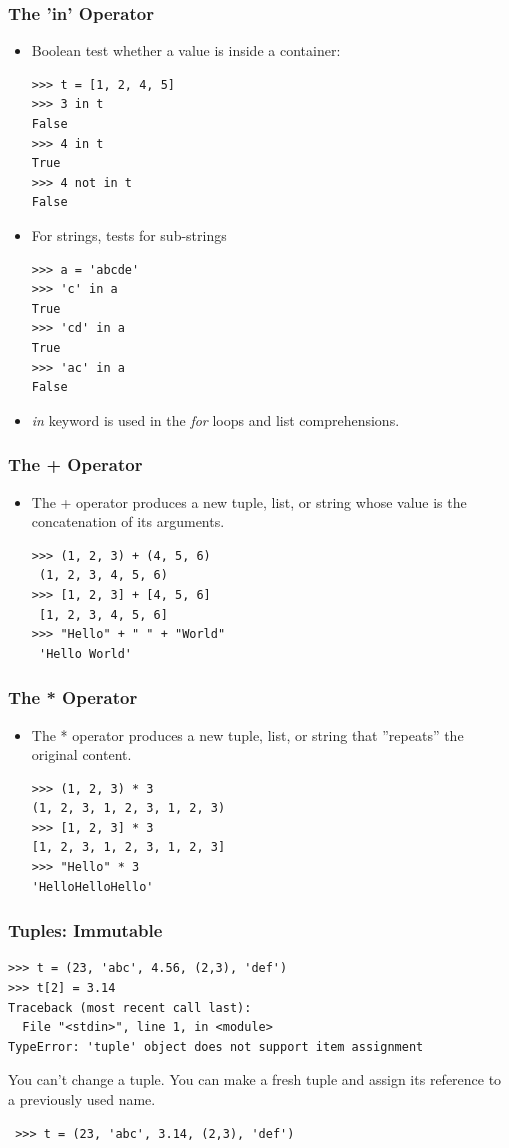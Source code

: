 \documentclass[12pt,handout]{beamer}
\begin{document}
\begin{frame}[fragile]
\frametitle{The 'in' Operator}
\begin{itemize}
\item Boolean test whether a value is inside a container:
\small{
\begin{verbatim}
>>> t = [1, 2, 4, 5]
>>> 3 in t
False
>>> 4 in t
True
>>> 4 not in t
False
\end{verbatim}
}
\item For strings, tests for sub-strings
\small{
\begin{verbatim}
>>> a = 'abcde'
>>> 'c' in a
True
>>> 'cd' in a
True
>>> 'ac' in a
False
\end{verbatim}
}
\item {\it in} keyword is used in the {\it for} loops
and list comprehensions.
\end{itemize}
\end{frame}


\begin{frame}[fragile]
\frametitle{The + Operator}
\begin{itemize}
\item The + operator produces a new tuple, list, or string whose
value is the concatenation of its arguments.
\small{
\begin{verbatim}
>>> (1, 2, 3) + (4, 5, 6)
 (1, 2, 3, 4, 5, 6)
>>> [1, 2, 3] + [4, 5, 6]
 [1, 2, 3, 4, 5, 6]
>>> "Hello" + " " + "World"
 'Hello World'
\end{verbatim}
}
\end{itemize}
\end{frame}


\begin{frame}[fragile]
\frametitle{The * Operator}
\begin{itemize}
\item The * operator produces a new tuple, list, or string that
''repeats'' the original content.
\small{
\begin{verbatim}
>>> (1, 2, 3) * 3
(1, 2, 3, 1, 2, 3, 1, 2, 3)
>>> [1, 2, 3] * 3
[1, 2, 3, 1, 2, 3, 1, 2, 3]
>>> "Hello" * 3
'HelloHelloHello'
\end{verbatim}
}
\end{itemize}
\end{frame}


\begin{frame}[fragile]
\frametitle{Tuples: Immutable}
\small{
\begin{verbatim}
>>> t = (23, 'abc', 4.56, (2,3), 'def')
>>> t[2] = 3.14
Traceback (most recent call last):
  File "<stdin>", line 1, in <module>
TypeError: 'tuple' object does not support item assignment
\end{verbatim}
}
You can't change a tuple.
You can make a fresh tuple and assign its reference to a previously used
name.
\small{
\begin{verbatim}
 >>> t = (23, 'abc', 3.14, (2,3), 'def')
\end{verbatim}
}
\end{frame}
\end{document}
